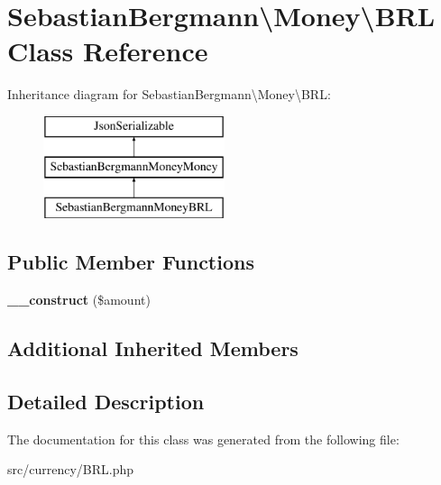 \hypertarget{classSebastianBergmann_1_1Money_1_1BRL}{}\section{Sebastian\+Bergmann\textbackslash{}Money\textbackslash{}B\+R\+L Class Reference}
\label{classSebastianBergmann_1_1Money_1_1BRL}
Inheritance diagram for Sebastian\+Bergmann\textbackslash{}Money\textbackslash{}B\+R\+L\+:\begin{figure}[H]
\begin{center}
\leavevmode
\includegraphics[height=3.000000cm]{classSebastianBergmann_1_1Money_1_1BRL}
\end{center}
\end{figure}
\subsection*{Public Member Functions}
\begin{DoxyCompactItemize}
\item 
\hypertarget{classSebastianBergmann_1_1Money_1_1BRL_a3269aaca673a5eb23aac97a8771478a9}{}{\bfseries \+\_\+\+\_\+construct} (\$amount)\label{classSebastianBergmann_1_1Money_1_1BRL_a3269aaca673a5eb23aac97a8771478a9}

\end{DoxyCompactItemize}
\subsection*{Additional Inherited Members}


\subsection{Detailed Description}


The documentation for this class was generated from the following file\+:\begin{DoxyCompactItemize}
\item 
src/currency/B\+R\+L.\+php\end{DoxyCompactItemize}
